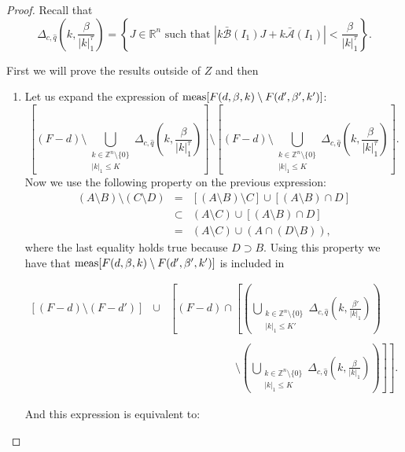 \begin{proof}
Recall that
$$\Delta_{c,\hat q}\left(k,\frac{\beta}{|k|_1^\tau}\right) = \left\{J\in\mathbb{R}^n \text{ such that } \left|k\bar{\mathcal{B}}(I_1)J + k\bar{\mathcal{A}}(I_1)\right| < \frac{\beta}{|k|_1^\tau}\right\}.$$

First we will prove the results outside of $Z$ and then
\begin{enumerate}
\item Let us expand the expression of $\textnormal{meas}[F(d,\beta,k)\setminus F(d',\beta',k')]$:
$$\left[(F-d)\setminus \bigcup_{\substack{k\in\mathbb{Z}^n\setminus\{0\} \\ |k|_1 \leq K}} \Delta_{c,\hat q}\left(k,\frac{\beta}{|k|_1^\tau}\right)\right]\setminus\left[(F-d)\setminus \bigcup_{\substack{k\in\mathbb{Z}^n\setminus\{0\} \\ |k|_1 \leq K}} \Delta_{c,\hat q}\left(k,\frac{\beta}{|k|_1^\tau}\right)\right].$$
Now we use the following property on the previous expression:
$$\begin{array}{rcl}
(A\setminus B)\setminus(C\setminus D) &  = &  [(A\setminus B)\setminus C]\cup [(A\setminus B)\cap D]\\
 & \subset & (A\setminus C)\cup[(A\setminus B)\cap D] \\
 & = & (A\setminus C)\cup(A\cap(D\setminus B)),
\end{array}
$$
where the last equality holds true because $D \supset B$. Using this property we have that $\textnormal{meas}[F(d,\beta,k)\setminus F(d',\beta',k')]$  is included in

$$
\begin{array}{rcl}

[(F-d)\setminus(F-d')]&\cup&\displaystyle\left[(F-d)\cap\left[\left(\bigcup_{\substack{k\in\mathbb{Z}^n\setminus\{0\} \\ |k|_1 \leq K'}} \Delta_{c,\hat q}\left(k,\frac{\beta'}{|k|_1}\right)\right)\right.\right.\\
\\
& & \displaystyle \qquad \qquad \qquad
\setminus\left.\left.\left(\bigcup_{\substack{k\in\mathbb{Z}^n\setminus\{0\} \\ |k|_1 \leq K}} \Delta_{c,\hat q}\left(k,\frac{\beta}{|k|_1}\right) \right)\right]\right].

\end{array}
$$

And this expression is equivalent to:


\end{enumerate}
\end{proof}
